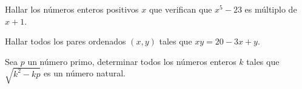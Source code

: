 \begin{exercise}
    Hallar los números enteros positivos $x$ que verifican que $x^5 - 23$ es múltiplo de $x + 1$.
\end{exercise}

\begin{exercise}
    Hallar todos los pares ordenados $(x,y)$ tales que $xy = 20 - 3x + y$.
\end{exercise}

\begin{problem}
    Sea $p$ un número primo, determinar todos los números enteros $k$ tales que $\sqrt {k^2 - kp}$ es un número natural.
\end{problem}
